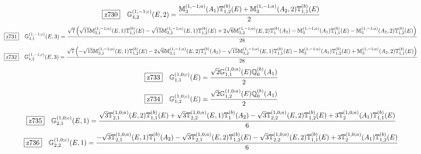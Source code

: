 \documentclass[fleqn,10pt,landscape]{jsarticle}
\begin{document}
\begin{dmath*}
\hspace*{3mm}\fbox{z730}\quad \mathbb{G}_{4,2}^{(1,-1;c)}(E,2)=\frac{\mathbb{M}_{3}^{(1,-1;a)}(A_{1}) \mathbb{T}_{1,2}^{(b)}(E) + \mathbb{M}_{3}^{(1,-1;a)}(A_{2},2) \mathbb{T}_{1,1}^{(b)}(E)}{2}
\end{dmath*}
\begin{dmath*}
\hspace*{3mm}\fbox{z731}\quad \mathbb{G}_{4,1}^{(1,-1;c)}(E,3)=\frac{\sqrt{7} \left(\sqrt{15} \mathbb{M}_{3,1}^{(1,-1;a)}(E,1) \mathbb{T}_{1,1}^{(b)}(E) - \sqrt{15} \mathbb{M}_{3,2}^{(1,-1;a)}(E,1) \mathbb{T}_{1,2}^{(b)}(E) + 2 \sqrt{6} \mathbb{M}_{3,2}^{(1,-1;a)}(E,2) \mathbb{T}_{1}^{(b)}(A_{2}) - \mathbb{M}_{3}^{(1,-1;a)}(A_{1}) \mathbb{T}_{1,1}^{(b)}(E) - \mathbb{M}_{3}^{(1,-1;a)}(A_{2},2) \mathbb{T}_{1,2}^{(b)}(E)\right)}{28}
\end{dmath*}
\begin{dmath*}
\hspace*{3mm}\fbox{z732}\quad \mathbb{G}_{4,2}^{(1,-1;c)}(E,3)=\frac{\sqrt{7} \left(- \sqrt{15} \mathbb{M}_{3,1}^{(1,-1;a)}(E,1) \mathbb{T}_{1,2}^{(b)}(E) - 2 \sqrt{6} \mathbb{M}_{3,1}^{(1,-1;a)}(E,2) \mathbb{T}_{1}^{(b)}(A_{2}) - \sqrt{15} \mathbb{M}_{3,2}^{(1,-1;a)}(E,1) \mathbb{T}_{1,1}^{(b)}(E) - \mathbb{M}_{3}^{(1,-1;a)}(A_{1}) \mathbb{T}_{1,2}^{(b)}(E) + \mathbb{M}_{3}^{(1,-1;a)}(A_{2},2) \mathbb{T}_{1,1}^{(b)}(E)\right)}{28}
\end{dmath*}
\begin{dmath*}
\hspace*{3mm}\fbox{z733}\quad \mathbb{G}_{1,1}^{(1,0;c)}(E)=\frac{\sqrt{2} \mathbb{G}_{1,1}^{(1,0;a)}(E) \mathbb{Q}_{0}^{(b)}(A_{1})}{2}
\end{dmath*}
\begin{dmath*}
\hspace*{3mm}\fbox{z734}\quad \mathbb{G}_{1,2}^{(1,0;c)}(E)=\frac{\sqrt{2} \mathbb{G}_{1,2}^{(1,0;a)}(E) \mathbb{Q}_{0}^{(b)}(A_{1})}{2}
\end{dmath*}
\begin{dmath*}
\hspace*{3mm}\fbox{z735}\quad \mathbb{G}_{2,1}^{(1,0;c)}(E,1)=\frac{\sqrt{3} \mathbb{T}_{2,1}^{(1,0;a)}(E,2) \mathbb{T}_{1,1}^{(b)}(E) + \sqrt{3} \mathbb{T}_{2,2}^{(1,0;a)}(E,1) \mathbb{T}_{1}^{(b)}(A_{2}) - \sqrt{3} \mathbb{T}_{2,2}^{(1,0;a)}(E,2) \mathbb{T}_{1,2}^{(b)}(E) + 3 \mathbb{T}_{2}^{(1,0;a)}(A_{1}) \mathbb{T}_{1,1}^{(b)}(E)}{6}
\end{dmath*}
\begin{dmath*}
\hspace*{3mm}\fbox{z736}\quad \mathbb{G}_{2,2}^{(1,0;c)}(E,1)=\frac{- \sqrt{3} \mathbb{T}_{2,1}^{(1,0;a)}(E,1) \mathbb{T}_{1}^{(b)}(A_{2}) - \sqrt{3} \mathbb{T}_{2,1}^{(1,0;a)}(E,2) \mathbb{T}_{1,2}^{(b)}(E) - \sqrt{3} \mathbb{T}_{2,2}^{(1,0;a)}(E,2) \mathbb{T}_{1,1}^{(b)}(E) + 3 \mathbb{T}_{2}^{(1,0;a)}(A_{1}) \mathbb{T}_{1,2}^{(b)}(E)}{6}
\end{dmath*}
\end{document}
